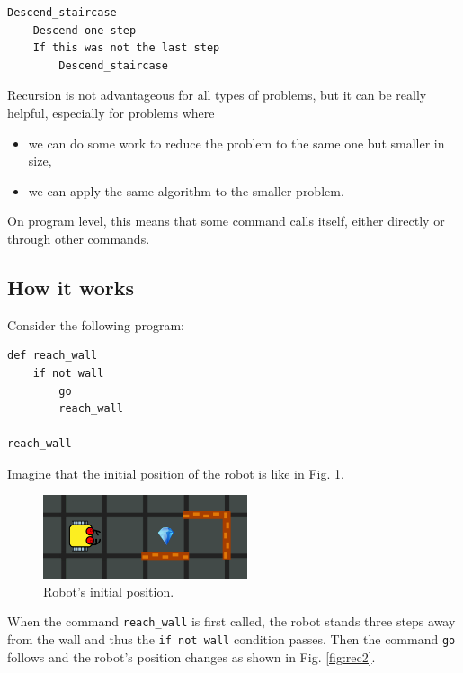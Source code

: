 \begin{verbatim}
Descend_staircase
    Descend one step
    If this was not the last step
        Descend_staircase
\end{verbatim}
Recursion is not advantageous for all types of problems, but it can be really 
helpful, especially for problems where 
\begin{itemize}
\item we can do some work to reduce the problem to the same one but smaller in size, 
\item we can apply the same algorithm to the smaller problem. 
\end{itemize}
On program level, this means that some command calls itself, either 
directly or through other commands.

\subsection{How it works} 

Consider the following program:
\begin{verbatim}
def reach_wall
    if not wall
        go
        reach_wall

reach_wall
\end{verbatim}
Imagine that the initial position of the robot is like in Fig. \ref{fig:rec1}.


\begin{figure}[!ht]
\begin{center}
\includegraphics[width=6cm]{imgk/rec-1.png}
\end{center}
\vspace{-4mm}
\caption{Robot's initial position.}
\label{fig:rec1}
\vspace{-4mm}
\end{figure}
\noindent
When the command {\tt reach\_wall} is first called, the robot stands three steps away from the wall and 
thus the {\tt if not wall} condition passes. Then the command {\tt go} follows and the robot's 
position changes as shown in Fig. \ref{fig:rec2}. 

